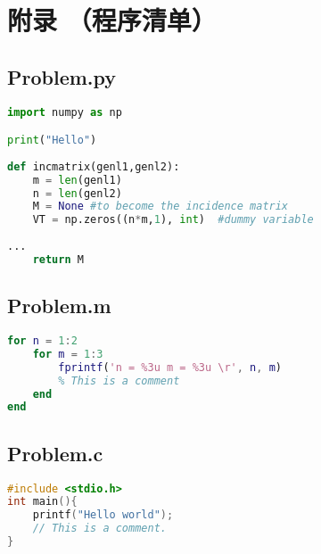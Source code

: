 \documentclass{ExpReport}
\begin{document}
\section*{附录 （程序清单） }
\subsection{Problem.py}
\begin{lstlisting}[language=Python]
import numpy as np

print("Hello")
    
def incmatrix(genl1,genl2):
    m = len(genl1)
    n = len(genl2)
    M = None #to become the incidence matrix
    VT = np.zeros((n*m,1), int)  #dummy variable
    
...
    return M
\end{lstlisting}

\subsection{Problem.m}
\begin{lstlisting}[language=matlab]
for n = 1:2
    for m = 1:3
        fprintf('n = %3u m = %3u \r', n, m)
        % This is a comment
    end
end
\end{lstlisting}

\subsection{Problem.c}
\begin{lstlisting}[language=c]
#include <stdio.h>
int main(){
    printf("Hello world");
    // This is a comment.
}
\end{lstlisting}
\end{document}

